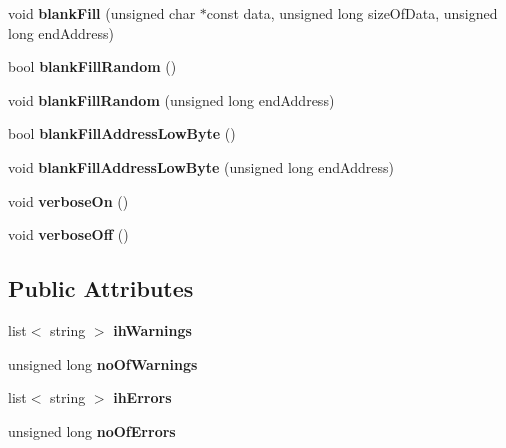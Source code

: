\begin{DoxyCompactItemize}
\item 
\hypertarget{classintelhex_aaf6f77af7a82623ef16471f105ac3fe7}{
void {\bfseries blankFill} (unsigned char $\ast$const data, unsigned long sizeOfData, unsigned long endAddress)}
\label{classintelhex_aaf6f77af7a82623ef16471f105ac3fe7}

\item 
\hypertarget{classintelhex_a9c26ba3dc9dd4f3021bb6c7f6983388f}{
bool {\bfseries blankFillRandom} ()}
\label{classintelhex_a9c26ba3dc9dd4f3021bb6c7f6983388f}

\item 
\hypertarget{classintelhex_aa1dbcbf3df1aaafd518882c882f43f76}{
void {\bfseries blankFillRandom} (unsigned long endAddress)}
\label{classintelhex_aa1dbcbf3df1aaafd518882c882f43f76}

\item 
\hypertarget{classintelhex_a2e5c67fccc34c78e6dbd28f4b795fb0f}{
bool {\bfseries blankFillAddressLowByte} ()}
\label{classintelhex_a2e5c67fccc34c78e6dbd28f4b795fb0f}

\item 
\hypertarget{classintelhex_ab7b16f457563da93569b9812fafb9e7d}{
void {\bfseries blankFillAddressLowByte} (unsigned long endAddress)}
\label{classintelhex_ab7b16f457563da93569b9812fafb9e7d}

\item 
\hypertarget{classintelhex_ac6a0119a04a2090af3ffe8c33a37cbc9}{
void {\bfseries verboseOn} ()}
\label{classintelhex_ac6a0119a04a2090af3ffe8c33a37cbc9}

\item 
\hypertarget{classintelhex_a3958f077a662291bbde3472ea2bcfb4d}{
void {\bfseries verboseOff} ()}
\label{classintelhex_a3958f077a662291bbde3472ea2bcfb4d}

\end{DoxyCompactItemize}
\subsection*{Public Attributes}
\begin{DoxyCompactItemize}
\item 
\hypertarget{classintelhex_a0ae0e9a75bdfaa50d6d0266bb3d56ed1}{
list$<$ string $>$ {\bfseries ihWarnings}}
\label{classintelhex_a0ae0e9a75bdfaa50d6d0266bb3d56ed1}

\item 
\hypertarget{classintelhex_a5ea3789cc9ea71c9b35322aabca05158}{
unsigned long {\bfseries noOfWarnings}}
\label{classintelhex_a5ea3789cc9ea71c9b35322aabca05158}

\item 
\hypertarget{classintelhex_a76fb4550b43dfbb08018cabf34298400}{
list$<$ string $>$ {\bfseries ihErrors}}
\label{classintelhex_a76fb4550b43dfbb08018cabf34298400}

\item 
\hypertarget{classintelhex_a451b78972165b898e91a129670fce919}{
unsigned long {\bfseries noOfErrors}}
\label{classintelhex_a451b78972165b898e91a129670fce919}

\end{DoxyCompactItemize}
